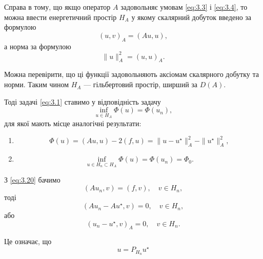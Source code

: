 Справа в тому, що якщо оператор $A$ задовольняє умовам \eqref{eq:3.3} і \eqref{eq:3.4}, то можна ввести енергетичний простір $H_A$ у якому скалярний добуток введено за формулою
\begin{equation}
    \label{eq:3.15}
    (u, v)_A = (A u, u),
\end{equation}
а норма за формулою
\begin{equation}
    \label{eq:3.16}
    \|u\|_A^2 = (u, u)_A.
\end{equation}

Можна перевірити, що ці функції задовольняють аксіомам скалярного добутку та норми. Таким чином $H_A$ --- гільбертовий простір, ширший за $D(A)$. \medskip

Тоді задачі \eqref{eq:3.1} ставимо у відповідність задачу
\begin{equation}
    \label{eq:3.18}
    \inf_{u \in H_A} \Phi(u) = \Phi(u_n),
\end{equation}
для якої мають місце аналогічні результати:

\begin{theorem}
    \begin{enumerate}
        \item \begin{equation}
            \label{eq:3.19}
            \Phi(u) = (A u, u) - 2 (f, u) = \|u - u^\star\|_A^2 - \|u^\star\|_A^2,
        \end{equation}
        \item \begin{equation}
            \label{eq:3.20}
            \inf_{u \in H_n \subset H_A} \Phi(u) = \Phi(u_n) = \Phi_0.
        \end{equation}
    \end{enumerate}
\end{theorem}

З \eqref{eq:3.20} бачимо
\begin{equation*}
    (A u_n, v) = (f, v), \quad v \in H_n,
\end{equation*}
тоді
\begin{equation*}
    (A u_n - A u^\star, v) = 0, \quad v \in H_n,
\end{equation*}
або
\begin{equation}
    \label{eq:3.21}
    (u_n - u^\star, v)_A = 0, \quad v \in H_n.
\end{equation}

Це означає, що
\begin{equation}
    \label{eq:3.22}
    u = P_{H_n} u^\star
\end{equation}


